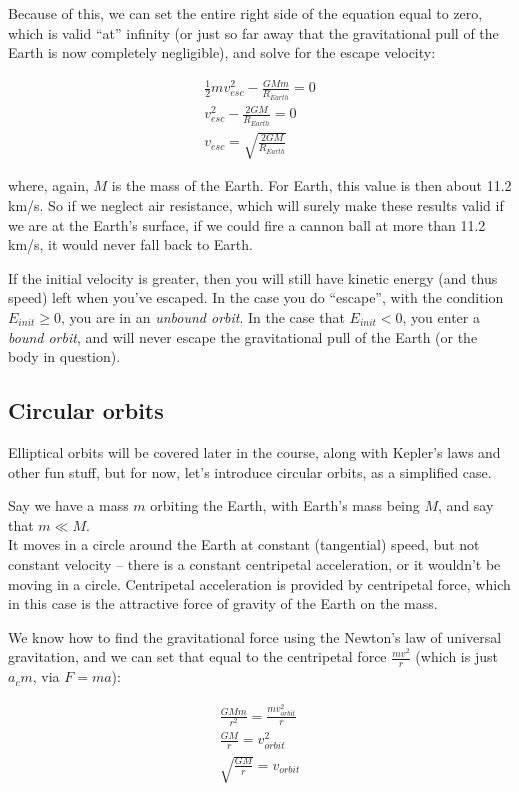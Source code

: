 \documentclass[8.01x]{subfiles}
\begin{document}
Because of this, we can set the entire right side of the equation equal to zero, which is valid ``at'' infinity (or just so far away that the gravitational pull of the Earth is now completely negligible), and solve for the escape velocity:

\begin{align}
\frac{1}{2} m v_{esc}^2 -\frac{G M m}{R_{Earth}} = 0\\
v_{esc}^2 -\frac{2 G M}{R_{Earth}} = 0\\
v_{esc} = \sqrt{\frac{2 G M}{R_{Earth}}}
\end{align}

where, again, $M$ is the mass of the Earth. For Earth, this value is then about 11.2 km/s. So if we neglect air resistance, which will surely make these results valid if we are at the Earth's surface, if we could fire a cannon ball at more than 11.2 km/s, it would never fall back to Earth.

If the initial velocity is greater, then you will still have kinetic energy (and thus speed) left when you've escaped. In the case you do ``escape'', with the condition $E_{init} \ge 0$, you are in an \emph{unbound orbit}. In the case that $E_{init} < 0$, you enter a \emph{bound orbit}, and will never escape the gravitational pull of the Earth (or the body in question).

\subsection{Circular orbits}

Elliptical orbits will be covered later in the course, along with Kepler's laws and other fun stuff, but for now, let's introduce circular orbits, as a simplified case.

Say we have a mass $m$ orbiting the Earth, with Earth's mass being $M$, and say that $m \ll M$.\\
It moves in a circle around the Earth at constant (tangential) speed, but not constant velocity -- there is a constant centripetal acceleration, or it wouldn't be moving in a circle. Centripetal acceleration is provided by centripetal force, which in this case is the attractive force of gravity of the Earth on the mass.

We know how to find the gravitational force using the Newton's law of universal gravitation, and we can set that equal to the centripetal force $\frac{m v^2}{r}$ (which is just $a_c m$, via $F = m a$):

\begin{align}
\frac{G M m}{r^2} = \frac{m v_{orbit}^2}{r}\\
\frac{G M}{r} = v_{orbit}^2\\
\sqrt{\frac{G M}{r}} = v_{orbit}
\end{align}
\end{document}
